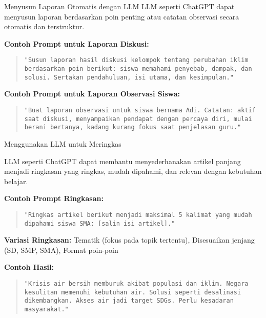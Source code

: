 \documentclass[aspectratio=169, table]{beamer}
\begin{document}
\begin{frame}[fragile]{Menyusun Laporan Otomatis dengan LLM}
	\vspace{20pt}
	LLM seperti ChatGPT dapat menyusun laporan berdasarkan poin penting atau catatan observasi secara otomatis dan terstruktur.
	
	\vspace{5pt}
	\textbf{Contoh Prompt untuk Laporan Diskusi:}
	\begin{quote}
		\centering
		\texttt{"Susun laporan hasil diskusi kelompok tentang perubahan iklim berdasarkan poin berikut: siswa memahami penyebab, dampak, dan solusi. Sertakan pendahuluan, isi utama, dan kesimpulan."}
	\end{quote}

		\vspace{5pt}
	\textbf{Contoh Prompt untuk Laporan Observasi Siswa:}
	\begin{quote}
		\centering
		\texttt{"Buat laporan observasi untuk siswa bernama Adi. Catatan: aktif saat diskusi, menyampaikan pendapat dengan percaya diri, mulai berani bertanya, kadang kurang fokus saat penjelasan guru."}
	\end{quote}
\end{frame}

\begin{frame}[fragile]{Menggunakan LLM untuk Meringkas}
	\vspace{20pt}
	
	LLM seperti ChatGPT dapat membantu menyederhanakan artikel panjang menjadi ringkasan yang ringkas, mudah dipahami, dan relevan dengan kebutuhan belajar.
	
			\vspace{5pt}
	\textbf{Contoh Prompt Ringkasan:}
	\begin{quote}
		\centering
		\texttt{"Ringkas artikel berikut menjadi maksimal 5 kalimat yang mudah dipahami siswa SMA: [salin isi artikel]."}
	\end{quote}
	
			\vspace{5pt}
	\textbf{Variasi Ringkasan:} Tematik (fokus pada topik tertentu), Disesuaikan jenjang (SD, SMP, SMA), Format poin-poin
	
			\vspace{5pt}
	\textbf{Contoh Hasil:}
	\begin{quote}
		\centering
		\texttt{"Krisis air bersih memburuk akibat populasi dan iklim. Negara kesulitan memenuhi kebutuhan air. Solusi seperti desalinasi dikembangkan. Akses air jadi target SDGs. Perlu kesadaran masyarakat."}
	\end{quote}
\end{frame}
\end{document}
